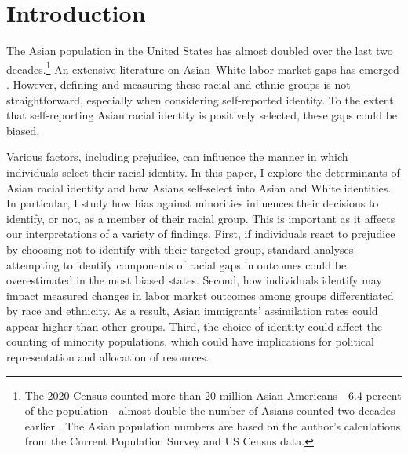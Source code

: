 
\section{Introduction}\label{sec:intro}

The Asian population in the United States has almost doubled over the last two decades.\footnote{The 2020 Census counted more than 20 million Asian Americans---6.4 percent of the population---almost double the number of Asians counted two decades earlier \autocite{floodsarahIntegratedPublicUse2021a}. The Asian population numbers are based on the author's calculations from the Current Population Survey and US Census data.} An extensive literature on Asian--White labor market gaps has emerged \autocite{chiswick1983analysis, duleep2012economic, hilger2016upward, arabsheibani2010asian}. However, defining and measuring these racial and ethnic groups is not straightforward, especially when considering self-reported identity. To the extent that self-reporting Asian racial identity is positively selected, these gaps could be biased.

Various factors, including prejudice, can influence the manner in which individuals select their racial identity. In this paper, I explore the determinants of Asian racial identity and how Asians self-select into Asian and White identities. In particular, I study how bias against minorities influences their decisions to identify, or not, as a member of their racial group. This is important as it affects our interpretations of a variety of findings. First, if individuals react to prejudice by choosing not to identify with their targeted group, standard analyses attempting to identify components of racial gaps in outcomes could be overestimated in the most biased states. Second, how individuals identify may impact measured changes in labor market outcomes among groups differentiated by race and ethnicity. As a result, Asian immigrants' assimilation rates could appear higher than other groups. Third, the choice of identity could affect the counting of minority populations, which could have implications for political representation and allocation of resources.


